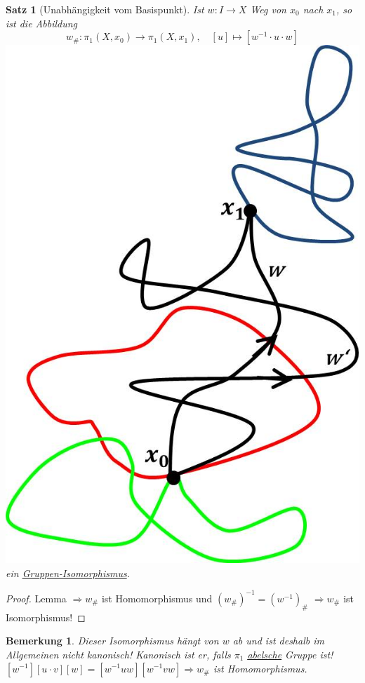 \documentclass[a4paper,11pt,notitlepage]{report}
\newtheorem{theorem}{Satz}[chapter]
\newtheorem{remark}{Bemerkung}[chapter]
\begin{document}
\begin{theorem}[Unabhängigkeit vom Basispunkt]
	Ist $w \colon I \rightarrow X$ Weg von $x_0$ nach $x_1$, so ist die Abbildung 
	$$w_\# \colon \pi_1(X,x_0) \rightarrow \pi_1(X,x_1), \quad [u] \mapsto [w^{-1} \cdot u \cdot w]$$ \includegraphics[scale=0.4]{images/Basispunkt_Unabhaengigkeit.jpg}
	ein \underline{Gruppen-Isomorphismus}.
\end{theorem}

\begin{proof}
	Lemma $\Rightarrow w_\#$ ist Homomorphismus und $(w_\#)^{-1} = (w^{-1})_\#$ \newline $\Rightarrow w_\#$ ist Isomorphismus!
\end{proof}

\begin{remark}
	Dieser Isomorphismus hängt von $w$ ab und ist deshalb im Allgemeinen nicht kanonisch!
	Kanonisch ist er, falls $\pi_1$ \underline{\underline{abelsche}} Gruppe ist!
	\newline
$[w^{-1}][u \cdot v][w] = [w^{-1} u w] [w^{-1} v w] \Rightarrow w_\#$ ist Homomorphismus.

\end{remark}
\end{document}
